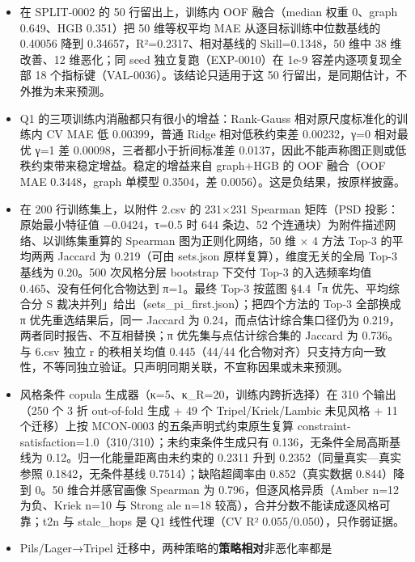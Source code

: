 \documentclass[
  11pt,
]{article}
\providecommand{\tightlist}{%
  \setlength{\itemsep}{0pt}\setlength{\parskip}{0pt}}
\begin{document}
\begin{itemize}
  \begin{itemize}
  \tightlist
  \item
    在 SPLIT-0002 的 50 行留出上，训练内 OOF 融合（median 权重 0、graph
    0.649、HGB 0.351）把 50 维等权平均 MAE 从逐目标训练中位数基线的
    0.40056 降到 0.34657，R²=0.2317、相对基线的 Skill=0.1348，50 维中 38
    维改善、12 维恶化；同 seed 独立复跑（EXP-0010）在 1e-9
    容差内逐项复现全部 18 个指标键（VAL-0036）。该结论只适用于这 50
    行留出，是同期估计，不外推为未来预测。
  \item
    Q1 的三项训练内消融都只有很小的增益：Rank-Gauss
    相对原尺度标准化的训练内 CV MAE 低 0.00399，普通 Ridge
    相对低秩约束差 0.00232，γ=0 相对最优 γ=1 差
    0.00098，三者都小于折间标准差
    0.0137，因此不能声称图正则或低秩约束带来稳定增益。稳定的增益来自
    graph+HGB 的 OOF 融合（OOF MAE 0.3448，graph 单模型 0.3504，差
    0.0056）。这是负结果，按原样披露。
  \item
    在 200 行训练集上，以附件 2.csv 的 231×231 Spearman 矩阵（PSD
    投影：原始最小特征值 −0.0424，τ=0.5 时 644 条边、52
    个连通块）为附件描述网络、以训练集重算的 Spearman 图为正则化网络，50
    维 × 4 方法 Top-3 的平均两两 Jaccard 为 0.219（可由 sets.json
    原样复算），维度无关的全局 Top-3 基线为 0.20。500 次风格分层
    bootstrap 下交付 Top-3 的入选频率均值 0.465、没有任何化合物达到
    π=1。最终 Top-3 按蓝图 §4.4「π 优先、平均综合分 S
    裁决并列」给出（sets\_pi\_first.json）；把四个方法的 Top-3 全部换成
    π 优先重选结果后，同一 Jaccard 为 0.24，而点估计综合集口径仍为
    0.219，两者同时报告、不互相替换；π 优先集与点估计综合集的 Jaccard 为
    0.736。与 6.csv 独立 \textbar r\textbar{} 的秩相关均值 0.445（44/44
    化合物对齐）只支持方向一致性，不等同独立验证。只声明同期关联，不宣称因果或未来预测。
  \item
    风格条件 copula 生成器（κ=5、κ\_R=20，训练内跨折选择）在 310
    个输出（250 个 3 折 out-of-fold 生成 + 49 个 Tripel/Kriek/Lambic
    未见风格 + 11 个迁移）上按 MCON-0003 的五条声明式约束原生复算
    constraint-satisfaction=1.0（310/310）；未约束条件生成只有
    0.136，无条件全局高斯基线为 0.12。归一化能量距离由未约束的 0.2311
    升到 0.2352（同量真实---真实参照 0.1842，无条件基线
    0.7514）；缺陷超阈率由 0.852（真实数据 0.844）降到 0。50
    维合并感官画像 Spearman 为 0.796，但逐风格异质（Amber n=12
    为负、Kriek n=10 与 Strong ale n=18
    较高），合并分数不能读成逐风格可靠；t2n 与 stale\_hops 是 Q1
    线性代理（CV R² 0.055/0.050），只作弱证据。
  \item
    Pils/Lager→Tripel 迁移中，两种策略的\textbf{策略相对}非恶化率都是

\end{itemize}
\end{itemize}
\end{document}
